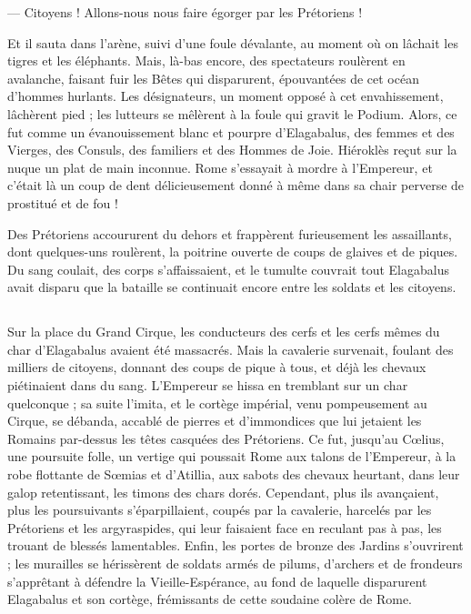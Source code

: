 \documentclass[a4paper, 11pt, oneside, polutonikogreek, french]{article}
\begin{document}
--- Citoyens ! Allons-nous nous faire égorger par les Prétoriens !

Et il sauta dans l'arène, suivi d'une foule dévalante, au moment où on lâchait les tigres et les éléphants. Mais, là-bas encore, des spectateurs roulèrent en avalanche, faisant fuir les Bêtes qui disparurent, épouvantées de cet océan d'hommes hurlants. Les désignateurs, un moment opposé à cet envahissement, lâchèrent pied ; les lutteurs se mêlèrent à la foule qui gravit le Podium. Alors, ce fut comme un évanouissement blanc et pourpre d'Elagabalus, des femmes et des Vierges, des Consuls, des familiers et des Hommes de Joie. Hiéroklès reçut sur la nuque un plat de main inconnue. Rome s'essayait à mordre à l'Empereur, et c'était là un coup de dent délicieusement donné à même dans sa chair perverse de prostitué et de fou !

Des Prétoriens accoururent du dehors et frappèrent furieusement les assaillants, dont quelques-uns roulèrent, la poitrine ouverte de coups de glaives et de piques. Du sang coulait, des corps s'affaissaient, et le tumulte couvrait tout Elagabalus avait disparu que la bataille se continuait encore entre les soldats et les citoyens.
\clearpage
\subsection{}
\paragraph{}
Sur la place du Grand Cirque, les conducteurs des cerfs et les cerfs mêmes du char d'Elagabalus avaient été massacrés. Mais la cavalerie survenait, foulant des milliers de citoyens, donnant des coups de pique à tous, et déjà les chevaux piétinaient dans du sang. L'Empereur se hissa en tremblant sur un char quelconque ; sa suite l'imita, et le cortège impérial, venu pompeusement au Cirque, se débanda, accablé de pierres et d'immondices que lui jetaient les Romains par-dessus les têtes casquées des Prétoriens. Ce fut, jusqu'au Cœlius, une poursuite folle, un vertige qui poussait Rome aux talons de l'Empereur, à la robe flottante de Sœmias et d'Atillia, aux sabots des chevaux heurtant, dans leur galop retentissant, les timons des chars dorés. Cependant, plus ils avançaient, plus les poursuivants s'éparpillaient, coupés par la cavalerie, harcelés par les Prétoriens et les argyraspides, qui leur faisaient face en reculant pas à pas, les trouant de blessés lamentables. Enfin, les portes de bronze des Jardins s'ouvrirent ; les murailles se hérissèrent de soldats armés de pilums, d'archers et de frondeurs s'apprêtant à défendre la Vieille-Espérance, au fond de laquelle disparurent Elagabalus et son cortège, frémissants de cette soudaine colère de Rome.
\end{document}
